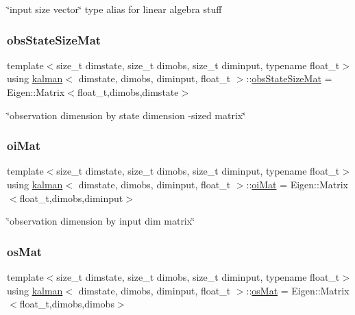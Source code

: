 \char`\"{}input size vector\char`\"{} type alias for linear algebra stuff \mbox{\label{classkalman_a13c0f71cc509326e1493982e9f23ebfc}} 
\subsubsection{\texorpdfstring{obs\+State\+Size\+Mat}{obsStateSizeMat}}
{\footnotesize\ttfamily template$<$size\+\_\+t dimstate, size\+\_\+t dimobs, size\+\_\+t diminput, typename float\+\_\+t$>$ \\
using \hyperlink{classkalman}{kalman}$<$ dimstate, dimobs, diminput, float\+\_\+t $>$\+::\hyperlink{classkalman_a13c0f71cc509326e1493982e9f23ebfc}{obs\+State\+Size\+Mat} =  Eigen\+::\+Matrix$<$float\+\_\+t,dimobs,dimstate$>$}

\char`\"{}observation dimension by state dimension -\/sized matrix\char`\"{} \mbox{\label{classkalman_a35298f18f0b699f700e2d55d94bf54fc}} 
\subsubsection{\texorpdfstring{oi\+Mat}{oiMat}}
{\footnotesize\ttfamily template$<$size\+\_\+t dimstate, size\+\_\+t dimobs, size\+\_\+t diminput, typename float\+\_\+t$>$ \\
using \hyperlink{classkalman}{kalman}$<$ dimstate, dimobs, diminput, float\+\_\+t $>$\+::\hyperlink{classkalman_a35298f18f0b699f700e2d55d94bf54fc}{oi\+Mat} =  Eigen\+::\+Matrix$<$float\+\_\+t,dimobs,diminput$>$}

\char`\"{}observation dimension by input dim matrix\char`\"{} \mbox{\label{classkalman_a28ffd71604fac7b25492b1b43379e046}} 
\subsubsection{\texorpdfstring{os\+Mat}{osMat}}
{\footnotesize\ttfamily template$<$size\+\_\+t dimstate, size\+\_\+t dimobs, size\+\_\+t diminput, typename float\+\_\+t$>$ \\
using \hyperlink{classkalman}{kalman}$<$ dimstate, dimobs, diminput, float\+\_\+t $>$\+::\hyperlink{classkalman_a28ffd71604fac7b25492b1b43379e046}{os\+Mat} =  Eigen\+::\+Matrix$<$float\+\_\+t,dimobs,dimobs$>$}

